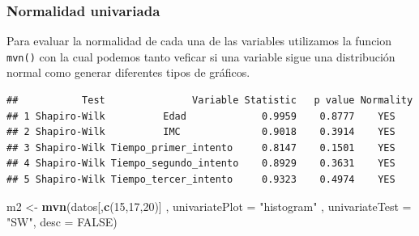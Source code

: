 \documentclass[
]{article}
\newenvironment{Shaded}{\begin{snugshade}}{\end{snugshade}}
\newcommand{\AttributeTok}[1]{\textcolor[rgb]{0.13,0.29,0.53}{#1}}
\newcommand{\CommentTok}[1]{\textcolor[rgb]{0.56,0.35,0.01}{\textit{#1}}}
\newcommand{\ConstantTok}[1]{\textcolor[rgb]{0.56,0.35,0.01}{#1}}
\newcommand{\DecValTok}[1]{\textcolor[rgb]{0.00,0.00,0.81}{#1}}
\newcommand{\FunctionTok}[1]{\textcolor[rgb]{0.13,0.29,0.53}{\textbf{#1}}}
\newcommand{\NormalTok}[1]{#1}
\newcommand{\OtherTok}[1]{\textcolor[rgb]{0.56,0.35,0.01}{#1}}
\newcommand{\SpecialCharTok}[1]{\textcolor[rgb]{0.81,0.36,0.00}{\textbf{#1}}}
\newcommand{\StringTok}[1]{\textcolor[rgb]{0.31,0.60,0.02}{#1}}
\begin{document}
\hypertarget{normalidad-univariada}{%
\subsubsection{Normalidad univariada}\label{normalidad-univariada}}

Para evaluar la normalidad de cada una de las variables utilizamos la
funcion \texttt{mvn()} con la cual podemos tanto veficar si una variable
sigue una distribución normal como generar diferentes tipos de gráficos.

\begin{Shaded}
\end{Shaded}

\begin{verbatim}
##           Test               Variable Statistic   p value Normality
## 1 Shapiro-Wilk          Edad             0.9959    0.8777    YES   
## 2 Shapiro-Wilk          IMC              0.9018    0.3914    YES   
## 3 Shapiro-Wilk Tiempo_primer_intento     0.8147    0.1501    YES   
## 4 Shapiro-Wilk Tiempo_segundo_intento    0.8929    0.3631    YES   
## 5 Shapiro-Wilk Tiempo_tercer_intento     0.9323    0.4974    YES
\end{verbatim}

\begin{Shaded}
\begin{Highlighting}[]
\NormalTok{m2 }\OtherTok{\textless{}{-}} \FunctionTok{mvn}\NormalTok{(datos[,}\FunctionTok{c}\NormalTok{(}\DecValTok{15}\NormalTok{,}\DecValTok{17}\NormalTok{,}\DecValTok{20}\NormalTok{)] , }\AttributeTok{univariatePlot =} \StringTok{"histogram"}\NormalTok{ , }\AttributeTok{univariateTest =} \StringTok{"SW"}\NormalTok{, }\AttributeTok{desc =} \ConstantTok{FALSE}\NormalTok{)}
\end{Highlighting}
\end{Shaded}
\end{document}
